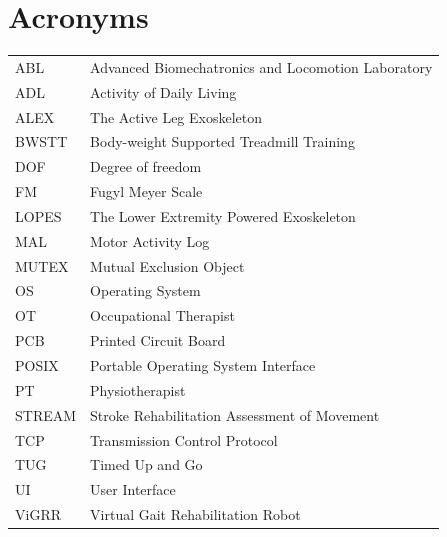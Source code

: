 \documentclass[12pt]{report}
\begin{document}
\afterpage{\null\newpage}
\tableofcontents
\listoffigures
\listoftables

\afterpage{\null\newpage}
\chapter*{Acronyms} 

\begin{tabular}{l l}
ABL \hspace{5mm} &Advanced Biomechatronics and Locomotion Laboratory \\
ADL \hspace{5mm} &Activity of Daily Living \\
ALEX \hspace{5mm} &The Active Leg Exoskeleton \\
BWSTT \hspace{5mm} &Body-weight Supported Treadmill Training \\
DOF \hspace{5mm} &Degree of freedom \\
FM \hspace{5mm} &Fugyl Meyer Scale \\
LOPES \hspace{5mm} &The Lower Extremity Powered Exoskeleton \\
MAL \hspace{5mm} &Motor Activity Log \\
MUTEX \hspace{5mm} &Mutual Exclusion Object \\
OS \hspace{5mm} &Operating System \\
OT \hspace{5mm} &Occupational Therapist \\
PCB \hspace{5mm} &Printed Circuit Board \\
POSIX \hspace{5mm} &Portable Operating System Interface \\
PT \hspace{5mm} &Physiotherapist \\
STREAM \hspace{5mm} &Stroke Rehabilitation Assessment of Movement \\
TCP \hspace{5mm} &Transmission Control Protocol \\
TUG \hspace{5mm} &Timed Up and Go \\
UI \hspace{5mm} &User Interface \\
ViGRR \hspace{5mm} &Virtual Gait Rehabilitation Robot \\
\end{tabular}
\end{document}
